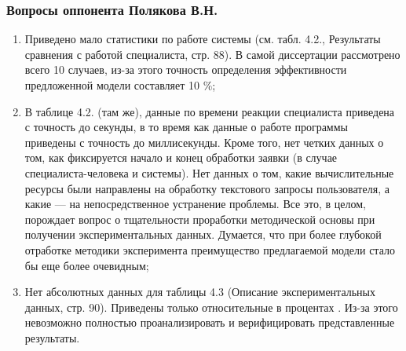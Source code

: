 \documentclass[14pt]{beamer}
\begin{document}
\begin{frame}
\frametitle{Вопросы оппонента Полякова В.Н.}
\begin{enumerate}
\scriptsize 
 \item Приведено мало статистики по работе системы (см. табл. 4.2., Результаты сравнения с работой специалиста, стр. 88). В самой диссертации рассмотрено всего 10 случаев, из-за этого точность определения эффективности предложенной модели составляет 10 \%;

\item В таблице 4.2. (там же), данные по времени реакции специалиста приведена с точность до секунды, в то время как данные о работе программы приведены с точность до миллисекунды. Кроме того, нет четких данных о том, как фиксируется начало и конец обработки заявки (в случае специалиста-человека и системы). Нет данных о том, какие вычислительные ресурсы были направлены на обработку текстового запросы пользователя, а какие — на непосредственное устранение проблемы. Все это, в целом, порождает вопрос о тщательности проработки методической основы при получении экспериментальных данных. Думается, что при более глубокой отработке методики эксперимента преимущество предлагаемой модели стало бы еще более очевидным;
\item Нет абсолютных данных для таблицы 4.3 (Описание экспериментальных данных, стр. 90). Приведены только относительные в процентах . Из-за этого невозможно полностью проанализировать и верифицировать представленные результаты.

\end{enumerate}
\end{frame}


\end{document}

